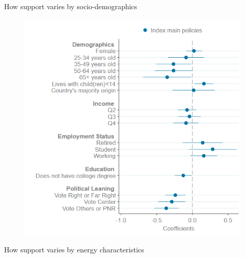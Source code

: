 \begin{framefont}{\small}
\begin{frame}{How support varies by socio-demographics}
\begin{figure}
	\includegraphics[width=.5\paperwidth]{../figures/FR/Coefplot_SetA_PlotA_index_main_policies.png}
\end{figure}
\end{frame}

\begin{frame}{How support varies by energy characteristics}


\end{frame}
\end{framefont}
